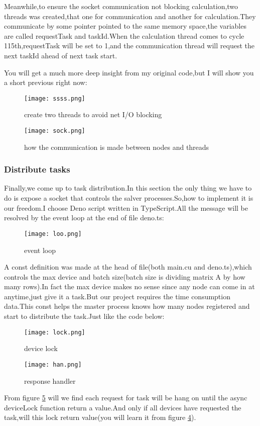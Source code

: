 \documentclass[12pt]{scrartcl} %
\begin{document}
Meanwhile,to ensure the socket communication not blocking calculation,two threads was created,that one for communication and another for calculation.They communicate by some pointer pointed to the same memory space,the variables are called requestTask and taskId.When the calculation thread comes to cycle 115th,requestTask will be set to 1,and the communication thread will request the next taskId ahead of next task start.

You will get a much more deep insight from my original code,but I will show you a short previous right now:
\begin{figure}[H]
    \centering
    \texttt{[image: ssss.png]}
    \caption{create two threads to avoid net I/O blocking}
    \label{}
\end{figure}
\begin{figure}[H]
    \centering
    \texttt{[image: sock.png]}
    \caption{how the communication is made between nodes and threads}
    \label{}
\end{figure}
\subsubsection{Distribute tasks}
Finally,we come up to task distribution.In this section the only thing we have to do is expose a socket that controls the salver processes.So,how to implement it is our freedom.I choose Deno script written in TypeScript.All the message will be resolved by the event loop at the end of file deno.ts:
\begin{figure}[H]
    \centering
    \texttt{[image: loo.png]}
    \caption{event loop}
    \label{}
\end{figure}

A const definition was made at the head of file(both main.cu and deno.ts),which controls the max device and batch size(batch size is dividing matrix A by how many rows).In fact the max device makes no sense since any node can come in at anytime,just give it a task.But our project requires the time consumption data.This const helps the master process knows how many nodes registered and start to distribute the task.Just like the code below:
\begin{figure}[H]
    \centering
    \texttt{[image: lock.png]}
    \caption{device lock}
    \label{dd}
\end{figure}
\begin{figure}[H]
    \centering
    \texttt{[image: han.png]}
    \caption{response handler}
    \label{rr}
\end{figure}
From figure \ref{rr} will we find each request for task will be hang on until the async deviceLock function return a value.And only if all devices have requested the task,will this lock return value(you will learn it from figure \ref{dd}).
\end{document}
